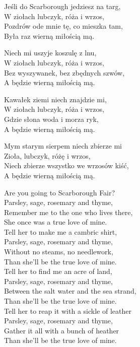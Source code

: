 \begin{text}
    \hfill\break
    Jeśli do Scarborough jedziesz na targ,\\
    W ziołach lubczyk, róża i wrzos,\\
    Pozdrów ode mnie tę, co mieszka tam,\\
    Była raz wierną miłością mą.

    Niech mi uszyje koszulę z lnu,\\
    W ziołach lubczyk, róża i wrzos,\\
    Bez wyszywanek, bez zbędnych szwów,\\
    A będzie wierną miłością mą.

    Kawałek ziemi niech znajdzie mi,\\
    W ziołach lubczyk, róża i wrzos,\\
    Gdzie słona woda i morza ryk,\\
    A będzie wierną miłością mą.

    Mym starym sierpem niech zbierze mi\\
    Zioła, lubczyk, różę i wrzos,\\
    Niech zbierze wszystko we wrzosów kiść,\\
    A będzie wierną miłością mą.

    Are you going to Scarborough Fair?\\
    Parsley, sage, rosemary and thyme,\\
    Remember me to the one who lives there,\\
    She once was a true love of mine.\\
    \vin Tell her to make me a cambric shirt,\\
    \vin Parsley, sage, rosemary and thyme,\\
    \vin Without no steams, no needlework,\\
    \vin Than she’ll be the true love of mine.\\
    Tell her to find me an acre of land,\\
    Parsley, sage, rosemary and thyme,\\
    Between the salt water and the sea strand,\\
    Than she’ll be the true love of mine.\\
    \vin Tell her to reap it with a sickle of leather\\
    \vin Parsley, sage, rosemary and thyme,\\
    \vin Gather it all with a bunch of heather\\
    \vin Than she’ll be the true love of mine.
\end{text}
